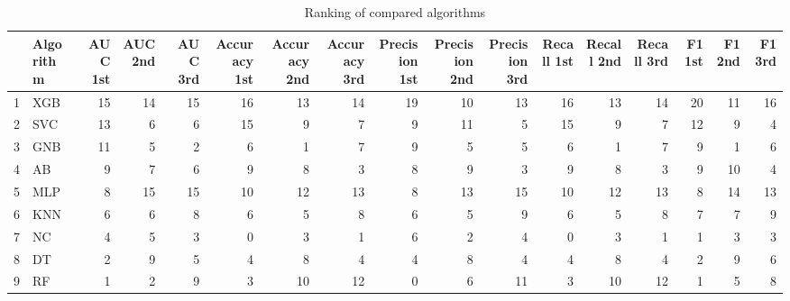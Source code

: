 \begin{table}
\footnotesize
\caption{Ranking of compared algorithms}
\label{tab:places}
\begin{tabular}{llrrrrrrrrrrrrrrr}
\hline
 & Algorithm & AUC 1st & AUC 2nd & AUC 3rd & Accuracy 1st & Accuracy 2nd & Accuracy 3rd & Precision 1st & Precision 2nd & Precision 3rd & Recall 1st & Recall 2nd & Recall 3rd & F1 1st & F1 2nd & F1 3rd \\
\hline
1 & XGB & 15 & 14 & 15 & 16 & 13 & 14 & 19 & 10 & 13 & 16 & 13 & 14 & 20 & 11 & 16 \\
2 & SVC & 13 & 6 & 6 & 15 & 9 & 7 & 9 & 11 & 5 & 15 & 9 & 7 & 12 & 9 & 4 \\
3 & GNB & 11 & 5 & 2 & 6 & 1 & 7 & 9 & 5 & 5 & 6 & 1 & 7 & 9 & 1 & 6 \\
4 & AB & 9 & 7 & 6 & 9 & 8 & 3 & 8 & 9 & 3 & 9 & 8 & 3 & 9 & 10 & 4 \\
5 & MLP & 8 & 15 & 15 & 10 & 12 & 13 & 8 & 13 & 15 & 10 & 12 & 13 & 8 & 14 & 13 \\
6 & KNN & 6 & 6 & 8 & 6 & 5 & 8 & 6 & 5 & 9 & 6 & 5 & 8 & 7 & 7 & 9 \\
7 & NC & 4 & 5 & 3 & 0 & 3 & 1 & 6 & 2 & 4 & 0 & 3 & 1 & 1 & 3 & 3 \\
8 & DT & 2 & 9 & 5 & 4 & 8 & 4 & 4 & 8 & 4 & 4 & 8 & 4 & 2 & 9 & 6 \\
9 & RF & 1 & 2 & 9 & 3 & 10 & 12 & 0 & 6 & 11 & 3 & 10 & 12 & 1 & 5 & 8 \\
\hline
\end{tabular}
\end{table}
